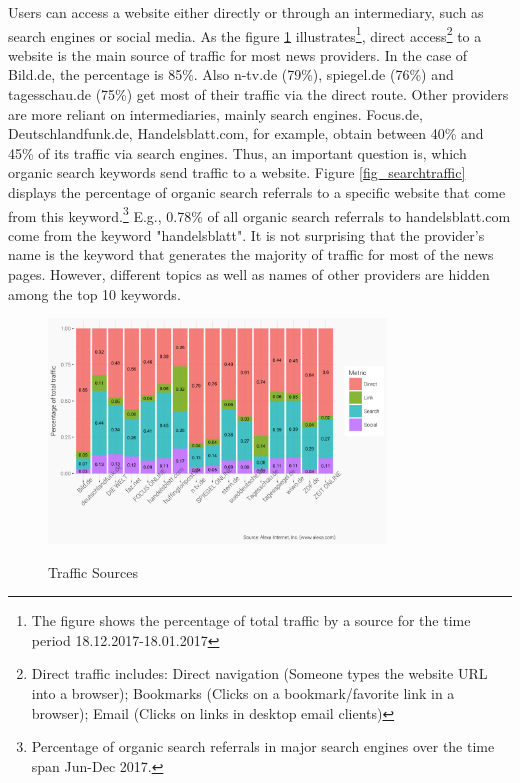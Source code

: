 \documentclass[12pt,a4paper,notitlepage]{article}
\begin{document}
Users can access a website either directly or through an intermediary, such as search engines or social media. As the figure \ref{fig_traffic} illustrates\footnote{The figure shows the percentage of total traffic by a source for the time period 18.12.2017-18.01.2017}, direct access\footnote{Direct traffic includes: Direct navigation (Someone types the website URL into a browser); Bookmarks (Clicks on a bookmark/favorite link in a browser); Email (Clicks on links in desktop email clients)} to a website is the main source of traffic for most news providers. In the case of Bild.de, the percentage is 85\%. Also n-tv.de (79\%), spiegel.de (76\%) and tagesschau.de (75\%) get most of their traffic via the direct route. Other providers are more reliant on intermediaries, mainly search engines. Focus.de, Deutschlandfunk.de, Handelsblatt.com, for example, obtain between 40\% and 45\% of its traffic via search engines. Thus, an important question is, which organic search keywords send traffic to a website. Figure \ref{fig_searchtraffic} displays the percentage of organic search referrals to a specific website that come from this keyword.\footnote{Percentage of organic search referrals in major search engines over the time span Jun-Dec 2017.} E.g., 0.78\% of all organic search referrals to handelsblatt.com come from the keyword "handelsblatt". It is not surprising that the provider's name is the keyword that generates the majority of traffic for most of the news pages. However, different topics as well as names of other providers are hidden among the top 10 keywords.   

\begin{figure}[H]
	\caption{Traffic Sources}
	\begin{center}
		\includegraphics[width=0.8\textwidth]{../figs/traffic_source.png}
		\label{fig_traffic}
	\end{center}
\end{figure}
\end{document}
